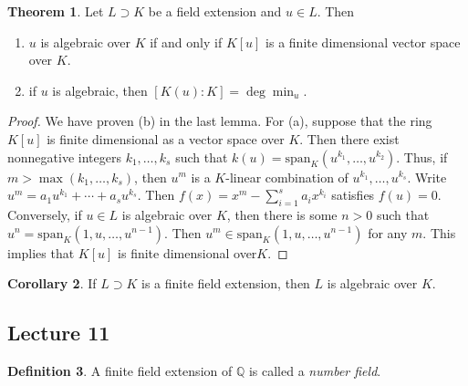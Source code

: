 \documentclass[10pt,letterpaper,cm]{nupset}
\theoremstyle{definition}
\newtheorem{definition}{Definition}[subsection]
\theoremstyle{theorem}
\newtheorem{theorem}[definition]{Theorem}
\newtheorem{corollary}[definition]{Corollary}
\theoremstyle{remark}
\newcommand{\Q}{\mathbb Q}
\newcommand{\1}{\mathbf{1}}
\newcommand{\0}{\vec 0}
\begin{document}
\begin{theorem}
Let $L \supset K$ be a field extension and $u\in L$.  Then 
\begin{enumerate}[label=(\alph*)]
\item $u$ is algebraic over $K$ if and only if $K[u]$ is a finite dimensional vector space over $K$.
\item if $u$ is algebraic, then $[K(u) : K] = \deg{\min_u}$. 
\end{enumerate}
\end{theorem}
\begin{proof}
We have proven (b) in the last lemma. For (a), suppose that the ring $K[u]$ is finite dimensional as a vector space over $K$. Then there exist nonnegative integers $k_1, \ldots, k_s$ such that $k(u) = \text{span}_K(u^{k_1}, \ldots, u^{k_2})$. Thus, if $m > \max(k_1, \ldots, k_s)$, then $u^m$ is a $K$-linear combination of $u^{k_1}, \ldots, u^{k_s}$. Write $u^m = a_1u^{k_1} + \cdots + a_s u^{k_s}$. Then $f(x) = x^m - \sum_{i=1}^s a_i x^{k_i}$ satisfies  $f(u) = 0$. Conversely, if $u\in L$ is algebraic over $K$, then there is some $n>0$ such that $u^n = \text{span}_K(1, u, \ldots, u^{n-1})$. Then $u^m \in \text{span}_K(1, u, \ldots, u^{n-1})$ for any $m$. This implies that $K[u]$ is finite dimensional over$K$.
\end{proof}

\begin{corollary}
If $L\supset K$ is a finite field extension, then $L$ is algebraic over $K$.
\end{corollary}

\subsection{Lecture 11}

\begin{definition}
A finite field extension of $\Q$ is called a \textit{number field}.
\end{definition}
\end{document}
